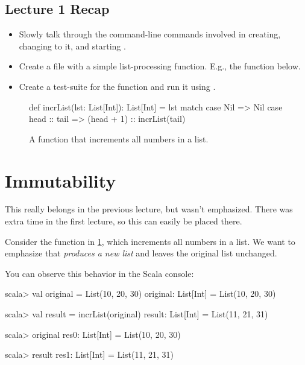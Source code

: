 \documentclass{book}
\begin{document}


\newlecture

\begin{instructor}

\section{Lecture 1 Recap}

\begin{itemize}

  \item Slowly talk through the command-line commands involved in creating,
  changing to it, and starting \sbt{}.

  \item Create a file with a simple list-processing function. E.g., the
   function below.

  \item Create a test-suite for the function and run it using \sbt{}.


\end{itemize}

\end{instructor}

\begin{figure}
\begin{scalacode}
def incrList(lst: List[Int]): List[Int] = lst match {
  case Nil => Nil
  case head :: tail => (head + 1) :: incrList(tail)
}
\end{scalacode}

\caption{A function that increments all numbers in a list.}
\label{incrlist}
\end{figure}

\section{Immutability }

\begin{instructor}
This really belongs in the previous lecture, but wasn't emphasized.
There was extra time in the first lecture, so this can easily be
placed there.
\end{instructor}

Consider the function  in \cref{incrlist}, which
increments all numbers in a list. We want to emphasize that 
\emph{produces a new list} and leaves the original list unchanged.

You can observe this behavior in the Scala console:
%
\begin{console}
scala> val original = List(10, 20, 30)
original: List[Int] = List(10, 20, 30)

scala> val result = incrList(original)
result: List[Int] = List(11, 21, 31)

scala> original
res0: List[Int] = List(10, 20, 30)

scala> result
res1: List[Int] = List(11, 21, 31)
\end{console}
\end{document}
